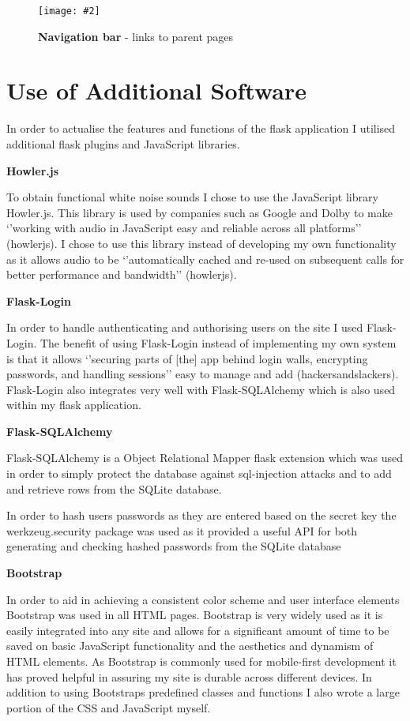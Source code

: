 \documentclass[10pt, a4paper]{article}
\newcommand{\figuremacro}[5]{
    \begin{figure}[#1]
        \centering
        \texttt{[image: \#2]}
        \caption[#3]{\textbf{#3}#4}
        \label{fig:#2}
    \end{figure}
}
\begin{document}
\figuremacro{h}{4}{Navigation bar}{ - links to parent pages}{1.0}





\section{Use of Additional Software}
In order to actualise the features and functions of the flask application I utilised additional flask plugins and JavaScript libraries. 

\textbf{Howler.js}

To obtain functional white noise sounds I chose to use the JavaScript library Howler.js. This library is used by companies such as Google and Dolby to make `'working with audio in JavaScript easy and reliable across all platforms'' (howlerjs). I chose to use this library instead of developing my own functionality as it allows audio to be `'automatically cached and re-used on subsequent calls for better performance and bandwidth'' (howlerjs)\cite{howler.js}.

\textbf{Flask-Login}

In order to handle authenticating and authorising users on the site I used Flask-Login. The benefit of using Flask-Login instead of implementing my own system is that it allows `'securing parts of [the] app behind login walls, encrypting passwords, and handling sessions'' easy to manage and add (hackersandslackers)\cite{birchard_2019}. Flask-Login also integrates very well with Flask-SQLAlchemy which is also used within my flask application.

\textbf{Flask-SQLAlchemy}

Flask-SQLAlchemy is a Object Relational Mapper flask extension which was used in order to simply protect the database against sql-injection attacks and to add and retrieve rows from the SQLite database. 


In order to hash users passwords as they are entered based on the secret key the werkzeug.security package was used as it provided a useful API for both generating and checking hashed passwords from the SQLite database

\textbf{Bootstrap}

In order to aid in achieving a consistent color scheme and user interface elements Bootstrap was used in all HTML pages. Bootstrap is very widely used as it is easily integrated into any site and allows for a significant amount of time to be saved on basic JavaScript functionality and the aesthetics and dynamism of HTML elements. As Bootstrap is commonly used for mobile-first development it has proved helpful in assuring my site is durable across different devices. In addition to using Bootstraps predefined classes and functions I also wrote a large portion of the CSS and JavaScript myself.
\end{document}
